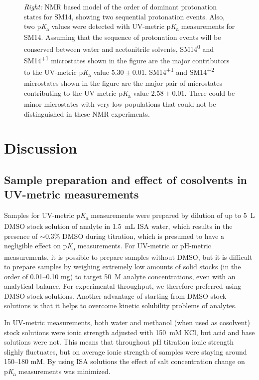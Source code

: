 \documentclass[9pt,lineno]{elife}
\newcommand{\pKa}{p\textit{K}\textsubscript{a}}
\begin{document}
\begin{figure}
\begin{center}
{\textit{Right:} NMR based model of the order of dominant protonation states for SM14, showing two sequential protonation events. 
Also, two \pKa{} values were detected with UV-metric \pKa{} measurements for SM14. 
Assuming that the sequence of protonation events will be conserved between water and acetonitrile solvents, SM14\textsuperscript{0} and SM14\textsuperscript{+1} microstates shown in the figure are the major contributors to the UV-metric \pKa{} value $5.30 \pm 0.01$. 
SM14\textsuperscript{+1} and SM14\textsuperscript{+2} microstates shown in the figure are the major pair of microstates contributing to the UV-metric \pKa{} value $2.58 \pm 0.01$. 
There could be minor microstates with very low populations that could not be distinguished in these NMR experiments.
}
\label{fig:NMR_microstates}
\end{center}
\end{figure}


\section{Discussion}

\subsection{Sample preparation and effect of cosolvents in UV-metric measurements}

Samples for UV-metric \pKa{} measurements were prepared by dilution of up to 5~{\micro}L DMSO stock solution of analyte in 1.5~mL ISA water, which results in the presence of $\sim$0.3\% DMSO during titration, which is presumed to have a negligible effect on \pKa{} measurements. 
For UV-metric or pH-metric measurements, it is possible to prepare samples without DMSO, but it is difficult to prepare samples by weighing extremely low amounts of solid stocks (in the order of 0.01--0.10 mg) to target 50~{\micro}M analyte concentrations, even with an analytical balance. 
For experimental throughput, we therefore preferred using DMSO stock solutions. 
Another advantage of starting from DMSO stock solutions is that it helps to overcome kinetic solubility problems of analytes.

In UV-metric measurements, both water and methanol (when used as cosolvent) stock solutions were ionic strength adjusted with 150~mM KCl, but acid and base solutions were not. This means that throughout pH titration ionic strength slighly fluctuates, but on average ionic strength of samples were staying around 150--180 mM. 
By using ISA solutions the effect of salt concentration change on \pKa{} measurements was minimized.
\end{document}
